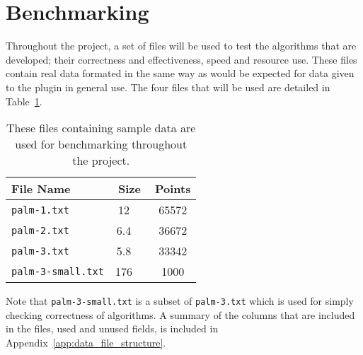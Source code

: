 
\section{Benchmarking}
\label{sec:benchmarking}

Throughout the project, a set of files will be used to test the algorithms that
are developed; their correctness and effectiveness, speed and resource use.
These files contain real data formated in the same way as would be expected for
data given to the plugin in general use. The four files that will be used are
detailed in Table~\ref{tab:benchmarking-files}.

\renewcommand{\arraystretch}{1.3}
\begin{table}[htbp]
\centering
\begin{tabular} {l c c}
	\toprule
	File Name & Size & Points \\
	\midrule
	\texttt{palm-1.txt} & \SI{12}{\mebi\byte} & 65572 \\
	\texttt{palm-2.txt} & \SI{6.4}{\mebi\byte} & 36672 \\
	\texttt{palm-3.txt} & \SI{5.8}{\mebi\byte} & 33342 \\
	\texttt{palm-3-small.txt} & \SI{176}{\kibi\byte} & 1000 \\
	\bottomrule
\end{tabular}
\caption{These files containing sample data are used for benchmarking
	throughout the project.}\label{tab:benchmarking-files}
\end{table}

Note that \texttt{palm-3-small.txt} is a subset of \texttt{palm-3.txt} which is
used for simply checking correctness of algorithms. A summary of the columns
that are included in the files, used and unused fields, is included in
Appendix~\ref{app:data_file_structure}.
